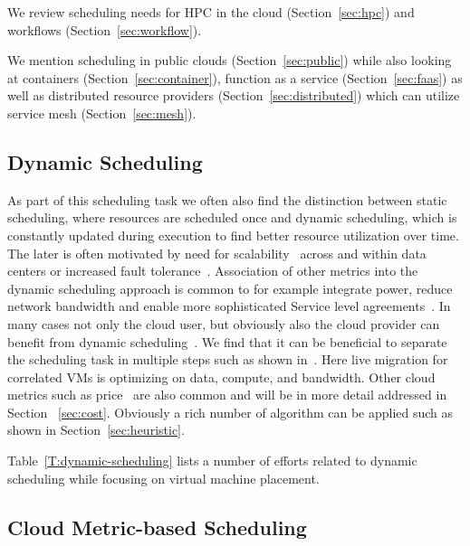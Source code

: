 \documentclass[final,5p,times,twocolumn]{elsarticle}
\begin{document}
We review scheduling needs for 
HPC in the cloud (Section~\ref{sec:hpc}) and 
workflows (Section~\ref{sec:workflow}).

We mention scheduling in public clouds (Section~\ref{sec:public})
while also looking at containers (Section~\ref{sec:container}),
function as a service (Section~\ref{sec:faas}) as well as distributed
resource providers (Section~\ref{sec:distributed}) which can utilize
service mesh (Section~\ref{sec:mesh}).





\subsection{Dynamic Scheduling}\label{sec:dynamic}



As part of this scheduling task we often also find the distinction
between static scheduling, where resources are scheduled once and dynamic scheduling, which is
constantly updated during execution to find better resource
utilization over time. The later is often motivated by need for
scalability~\cite{keller2014hierarchical} across and within data
centers or increased fault
tolerance~\cite{tighe2013distributed}. Association of other metrics
into the dynamic scheduling approach is common to for example
integrate power, reduce network bandwidth and enable more
sophisticated Service level agreements~\cite{tighe2013distributed}. In
many cases not only the cloud user, but obviously also the cloud
provider can benefit from dynamic
scheduling~\cite{tighe2014integrating}. We find that it can be
beneficial to separate the scheduling task in multiple steps such as
shown in~\cite{sun2015live}. Here live migration for correlated VMs is
optimizing on data, compute, and bandwidth. Other cloud metrics such
as price~\cite{tordsson2012cloud} are also common and will be in more
detail addressed in Section ~\ref{sec:cost}. Obviously a rich number
of algorithm can be applied such as shown in
Section~\ref{sec:heuristic}.

Table~\ref{T:dynamic-scheduling} lists a number of efforts related to
dynamic scheduling while focusing on virtual machine placement.






\subsection{Cloud Metric-based Scheduling}\label{sec:vm-scheduling}
\end{document}
